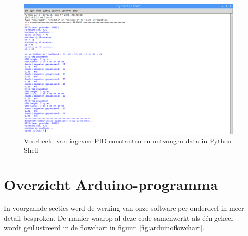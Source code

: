\begin{figure}[H]
	\centering
	\includegraphics[width=\textwidth]{bluetoothoutputvoorbeeldbijgesneden.png}
	\caption{Voorbeeld van ingeven PID-constanten en ontvangen data in Python Shell\label{fig:bluetoothoutput}}
\end{figure}

\section{Overzicht Arduino-programma}
In voorgaande secties werd de werking van onze software per onderdeel in meer detail besproken. De manier waarop al deze code samenwerkt als \'e\'en geheel wordt ge\"illustreerd in de flowchart in figuur~\vref{fig:arduinoflowchart}.

